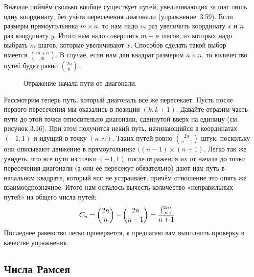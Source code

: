 Вначале поймём сколько вообще существует путей, увеличивающих за шаг лишь одну координату, без учёта пересечения диагонали (упражнение~3.59). Если размеры прямоугольинка $m\times n$, то нам надо $m$ раз увеличить координату $x$ и $n$ раз координату $y$. Итого нам надо совершить $m+n$ шагов, из которых надо выбрать $m$ шагов, которые увеличивают $x$. Способов сделать такой выбор имеется ${m + n \choose m}$. В случае, если нам дан квадрат размером $n\times n$, то количество путей будет равно ${2n\choose n}$.

\begin{figure}[h]
\caption{Отражение начала пути от диагонали.}
\end{figure}

Рассмотрим теперь путь, который диагональ всё же пересекает. Пусть после первого пересечения мы оказались в позиции $(k, k+1)$. Давайте отразим часть пути до этой точки относительно диагонали, сдвинутой вверх на единицу (см. рисунок 3.16). При этом получится некий путь, начинающийся в координатах $(-1, 1)$ и идущий в точку $(n, n)$. Таких путей ровно ${2n\choose n-1}$ штук, поскольку они описывают движение в прямоугольнике $((n-1)\times (n+1)$. Легко так же увидеть, что все пути из точки $(-1, 1)$ после отражения их от начала до точки пересечения диагонали (а они её пересекут обязательно) дают нам путь в начальном квадрате, который нас не устраивает, причём отношение это опять же взаимооднозначное. Итого нам осталось вычесть количество «неправильных путей» из общего числа путей:
$$C_n = {2n\choose n} - {2n\choose n-1} = {{2n\choose n}\over n+1}$$
Последнее равенство легко проверяется, я предлагаю вам выполнить проверку в качестве упражнения.

\subsection{Числа Рамсея}

